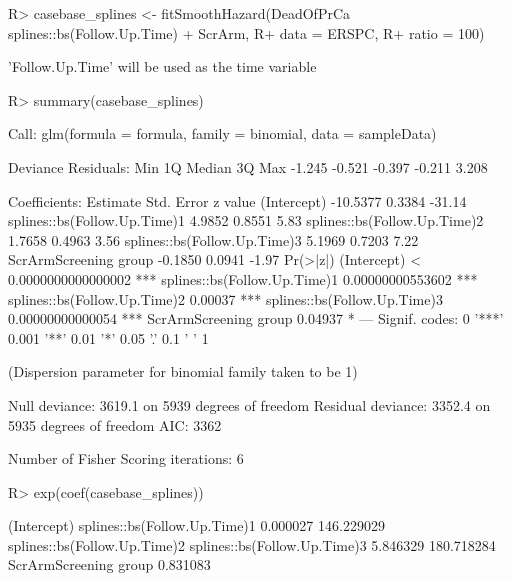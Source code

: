 \documentclass[article]{jss}
\begin{document}
\begin{CodeChunk}

\begin{CodeInput}
R> casebase_splines <- fitSmoothHazard(DeadOfPrCa ~ splines::bs(Follow.Up.Time) + ScrArm, 
R+                                     data = ERSPC, 
R+                                     ratio = 100)
\end{CodeInput}

\begin{CodeOutput}
'Follow.Up.Time' will be used as the time variable
\end{CodeOutput}

\begin{CodeInput}
R> summary(casebase_splines)
\end{CodeInput}

\begin{CodeOutput}

Call:
glm(formula = formula, family = binomial, data = sampleData)

Deviance Residuals: 
   Min      1Q  Median      3Q     Max  
-1.245  -0.521  -0.397  -0.211   3.208  

Coefficients:
                             Estimate Std. Error z value
(Intercept)                  -10.5377     0.3384  -31.14
splines::bs(Follow.Up.Time)1   4.9852     0.8551    5.83
splines::bs(Follow.Up.Time)2   1.7658     0.4963    3.56
splines::bs(Follow.Up.Time)3   5.1969     0.7203    7.22
ScrArmScreening group         -0.1850     0.0941   -1.97
                                         Pr(>|z|)    
(Intercept)                  < 0.0000000000000002 ***
splines::bs(Follow.Up.Time)1     0.00000000553602 ***
splines::bs(Follow.Up.Time)2              0.00037 ***
splines::bs(Follow.Up.Time)3     0.00000000000054 ***
ScrArmScreening group                     0.04937 *  
---
Signif. codes:  0 '***' 0.001 '**' 0.01 '*' 0.05 '.' 0.1 ' ' 1

(Dispersion parameter for binomial family taken to be 1)

    Null deviance: 3619.1  on 5939  degrees of freedom
Residual deviance: 3352.4  on 5935  degrees of freedom
AIC: 3362

Number of Fisher Scoring iterations: 6
\end{CodeOutput}

\begin{CodeInput}
R> exp(coef(casebase_splines))
\end{CodeInput}

\begin{CodeOutput}
                 (Intercept) splines::bs(Follow.Up.Time)1 
                    0.000027                   146.229029 
splines::bs(Follow.Up.Time)2 splines::bs(Follow.Up.Time)3 
                    5.846329                   180.718284 
       ScrArmScreening group 
                    0.831083 
\end{CodeOutput}


\end{CodeChunk}
\end{document}
